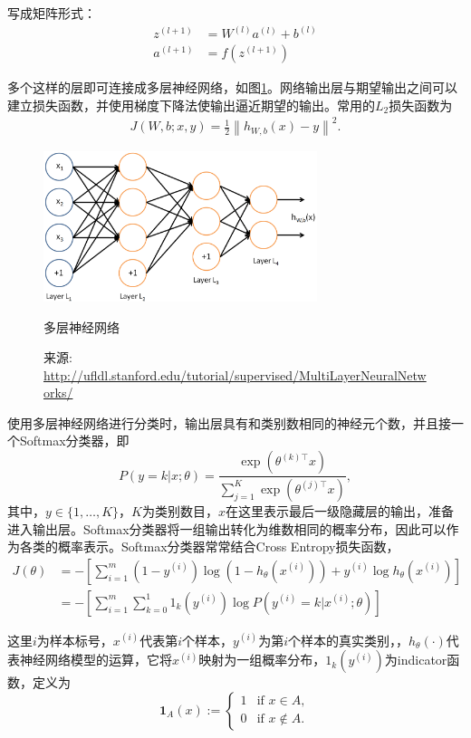 	写成矩阵形式：
	\begin{align}
	z^{(l+1)} &= W^{(l)} a^{(l)} + b^{(l)}   \\
	a^{(l+1)} &= f(z^{(l+1)})
	\end{align}

	多个这样的层即可连接成多层神经网络，如图\ref{fig:n3322}。网络输出层与期望输出之间可以建立损失函数，并使用梯度下降法使输出逼近期望的输出。常用的$L_2$损失函数为
	\begin{align}
	J(W,b; x,y) = \frac{1}{2} \left\| h_{W,b}(x) - y \right\|^2.
	\end{align}

	\begin{figure}[htbp]
	\centering
	\includegraphics[width=8cm]{resource/Network3322.png}
	\caption{多层神经网络}
	\caption*{\small 来源: \url{http://ufldl.stanford.edu/tutorial/supervised/MultiLayerNeuralNetworks/}}
	\label{fig:n3322}
	\end{figure}

	使用多层神经网络进行分类时，输出层具有和类别数相同的神经元个数，并且接一个{\ttfamily Softmax}分类器，即
	\begin{equation}
	P(y = k | x ; \theta) = \frac{\exp(\theta^{(k)\top} x)}{\sum_{j=1}^K \exp(\theta^{(j)\top} x) },
	\end{equation}
	其中，$y \in \{1,\ldots,K\}$，$K$为类别数目，$x$在这里表示最后一级隐藏层的输出，准备进入输出层。{\ttfamily Softmax}分类器将一组输出转化为维数相同的概率分布，因此可以作为各类的概率表示。{\ttfamily Softmax}分类器常常结合{\ttfamily Cross Entropy}损失函数，
	\begin{align}
	J(\theta) &= - \left[ \sum_{i=1}^m   (1-y^{(i)}) \log (1-h_\theta(x^{(i)})) + y^{(i)} \log h_\theta(x^{(i)}) \right] \\
	&= - \left[ \sum_{i=1}^{m} \sum_{k=0}^{1} 1_k\left(y^{(i)}\right) \log P(y^{(i)} = k | x^{(i)} ; \theta) \right]
	\end{align}

	这里$i$为样本标号，$x^{(i)}$代表第$i$个样本，$y^{(i)}$为第$i$个样本的真实类别，，$h_\theta(\cdot)$代表神经网络模型的运算，它将$x^{(i)}$映射为一组概率分布，$1_k\left(y^{(i)}\right)$为{\ttfamily indicator}函数，定义为
	\begin{equation}\mathbf{1}_A(x) :=
	\begin{cases}
	1 &\text{if } x \in A, \\
	0 &\text{if } x \notin A.
	\end{cases}
	\end{equation}

